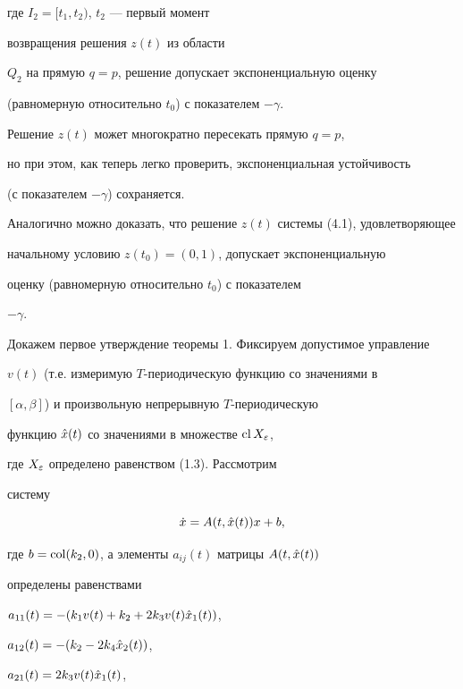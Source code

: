 \begin{pf}
где $I_2=[t_1,t_2)$, $t_2$ --- первый момент


возвращения решения $z(t)$ из области


$Q_2$ на прямую $q=p$, решение допускает экспоненциальную оценку


(равномерную относительно $t_0$) с показателем $-\gamma$.


Решение $z(t)$ может многократно пересекать прямую $q=p$,


но при этом, как теперь легко проверить, экспоненциальная устойчивость


(с показателем $-\gamma$) сохраняется.





Аналогично можно доказать, что решение $z(t)$ системы (4.1), удовлетворяющее


начальному условию $z(t_0)=(0,1)$, допускает экспоненциальную


оценку (равномерную относительно $t_0$) с показателем


$-\gamma$.


\end{pf}





Докажем первое утверждение теоремы 1. Фиксируем допустимое управление


$v(t)$ (т.е. измеримую $T$-периодическую функцию со значениями в


$[\alpha,\beta]$)  и произвольную непрерывную  $T$-периодическую


функцию $\Hat x(t)$ со значениями в множестве $\operatorname{cl} X_{\varepsilon}$,


где $ X_{\varepsilon}$ определено равенством (1.3). Рассмотрим


систему


%


\begin{equation}


\Dot x = A(t,\Hat x(t))x + b,


\end{equation}


%


где $b=\operatorname{col}(k_2, 0)$, а элементы $a_{ij}(t)$ матрицы $A(t,\Hat x(t))$


определены равенствами


$a_{11}(t)= -(k_1 v(t) + k_2 + 2k_3v(t)\Hat x_1(t))$,


$a_{12}(t)= -(k_2 - 2k_4\Hat x_2(t))$,


$a_{21}(t)=2k_3v(t)\Hat x_1(t)$,



